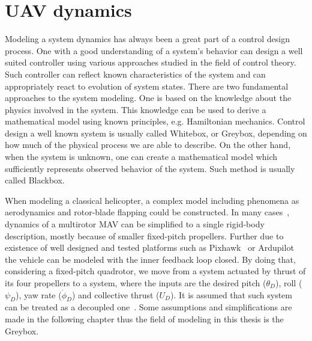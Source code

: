 \section{UAV dynamics}
\label{chap:uav_dynamics}

Modeling a system dynamics has always been a great part of a control design process. One with a good understanding of a system's behavior can design a well suited controller using various approaches studied in the field of control theory. Such controller can reflect known characteristics of the system and can appropriately react to evolution of system states. There are two fundamental approaches to the system modeling. One is based on the knowledge about the physics involved in the system. This knowledge can be used to derive a mathematical model using known principles, e.g. Hamiltonian mechanics. Control design a well known system is usually called Whitebox, or Greybox, depending on how much of the physical process we are able to describe. On the other hand, when the system is unknown, one can create a mathematical model which sufficiently represents observed behavior of the system. Such method is usually called Blackbox.

When modeling a classical helicopter, a complex model including phenomena as aerodynamics and rotor-blade flapping could be constructed. In many cases~\citep{alexis2014robust}\citep{mahony2012multirotor}, dynamics of a multirotor MAV can be simplified to a single rigid-body description, mostly because of smaller fixed-pitch propellers. Further due to existence of well designed and tested platforms such as Pixhawk~\citep{pixhawk} or Ardupilot~\citep{ardupilot} the vehicle can be modeled with the inner feedback loop closed. By doing that, considering a fixed-pitch quadrotor, we move from a system actuated by thrust of its four propellers to a system, where the inputs are the desired pitch ($\theta_D$), roll ($\psi_D$), yaw rate ($\dot{\phi}_D$) and collective thrust ($U_D$). It is assumed that such system can be treated as a decoupled one~\citep{mahony2012multirotor}. Some assumptions and simplifications are made in the following chapter thus the field of modeling in this thesis is the Greybox.


